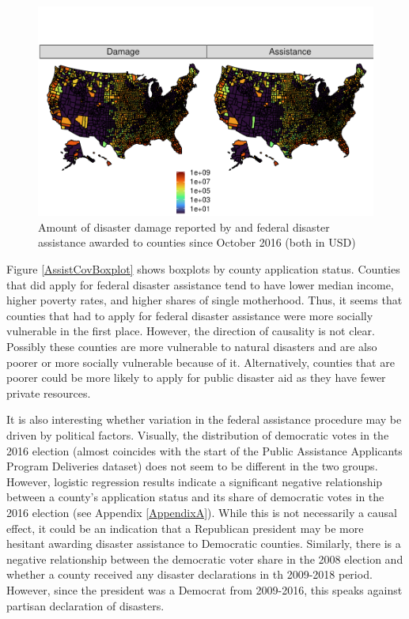 \begin{figure}[!h]
	\centering
	\includegraphics[scale=1]{"../Code & Data/AssistanceMap.pdf"}
	\caption{Amount of disaster damage reported by and federal disaster assistance awarded to counties since October 2016 (both in USD)}
	\label{AssistanceMap}
\end{figure}

Figure \ref{AssistCovBoxplot} shows boxplots by county application status. Counties that did apply for federal disaster assistance tend to have lower median income, higher poverty rates, and higher shares of single motherhood. Thus, it seems that counties that had to apply for federal disaster assistance were more socially vulnerable in the first place. However, the direction of causality is not clear. Possibly these counties are more vulnerable to natural disasters and are also poorer or more socially vulnerable because of it. Alternatively, counties that are poorer could be more likely to apply for public disaster aid as they have fewer private resources.

It is also interesting whether variation in the federal assistance procedure may be driven by political factors. Visually, the distribution of democratic votes in the 2016 election (almost coincides with the start of the Public Assistance Applicants Program Deliveries dataset) does not seem to be different in the two groups. However, logistic regression results indicate a significant negative relationship between a county's application status and its share of democratic votes in the 2016 election (see Appendix \ref{AppendixA}). While this is not necessarily a causal effect, it could be an indication that a Republican president may be more hesitant awarding disaster assistance to Democratic counties. Similarly, there is a negative relationship between the democratic voter share in the 2008 election and whether a county received any disaster declarations in th 2009-2018 period. However, since the president was a Democrat from 2009-2016, this speaks against partisan declaration of disasters.

